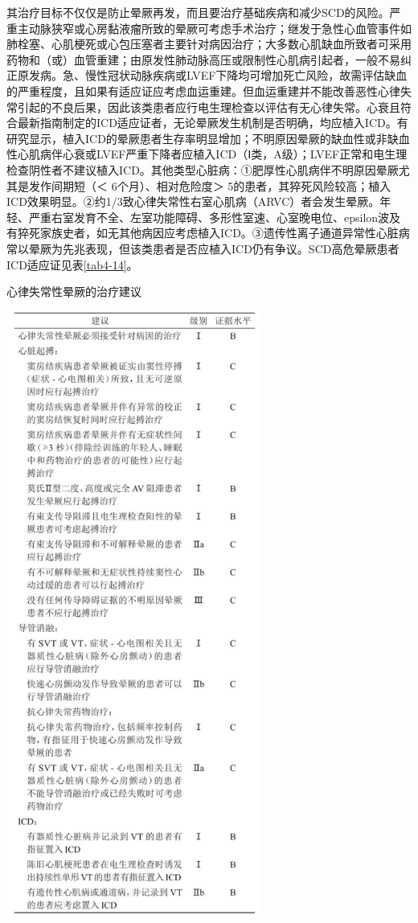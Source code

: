 其治疗目标不仅仅是防止晕厥再发，而且要治疗基础疾病和减少SCD的风险。严重主动脉狭窄或心房黏液瘤所致的晕厥可考虑手术治疗；继发于急性心血管事件如肺栓塞、心肌梗死或心包压塞者主要针对病因治疗；大多数心肌缺血所致者可采用药物和（或）血管重建；由原发性肺动脉高压或限制性心肌病引起者，一般不易纠正原发病。急、慢性冠状动脉疾病或LVEF下降均可增加死亡风险，故需评估缺血的严重程度，且如果有适应证应考虑血运重建。但血运重建并不能改善恶性心律失常引起的不良后果，因此该类患者应行电生理检查以评估有无心律失常。心衰且符合最新指南制定的ICD适应证者，无论晕厥发生机制是否明确，均应植入ICD。有研究显示，植入ICD的晕厥患者生存率明显增加；不明原因晕厥的缺血性或非缺血性心肌病伴心衰或LVEF严重下降者应植入ICD（Ⅰ类，A级）；LVEF正常和电生理检查阴性者不建议植入ICD。其他类型心脏病：①肥厚性心肌病伴不明原因晕厥尤其是发作间期短（＜
6个月）、相对危险度＞
5的患者，其猝死风险较高；植入ICD效果明显。②约1/3致心律失常性右室心肌病（ARVC）者会发生晕厥。年轻、严重右室发育不全、左室功能障碍、多形性室速、心室晚电位、epsilon波及有猝死家族史者，如无其他病因应考虑植入ICD。③遗传性离子通道异常性心脏病常以晕厥为先兆表现，但该类患者是否应植入ICD仍有争议。SCD高危晕厥患者ICD适应证见表\ref{tab4-14}。

\begin{table}[htbp]
\centering
\caption{心律失常性晕厥的治疗建议}
\label{tab4-13}
\includegraphics[width=3.29167in,height=7.86458in]{./images/Image00031.jpg}
\end{table}

